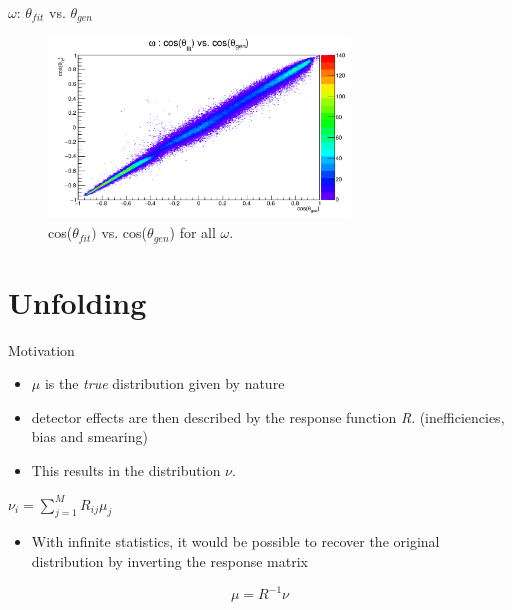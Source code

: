 \documentclass[
		10pt
		]{beamer}
\begin{document}
\begin{frame} {$\omega$: $\theta_{fit}$ vs. $\theta_{gen}$}

\begin{figure}
	
	\includegraphics[width=8cm]{Plots/MC/1/ThetaTheta1Omega.pdf}
	\captionsetup{labelformat=empty}
	\caption{cos($\theta_{fit})$ vs. cos($\theta_{gen}$) for all $\omega$.}
	
\end{figure}

\end{frame}

	



\section{Unfolding}

\begin{frame}{Motivation}
	\begin{itemize}
		\item $\mu$ is the \textit{true} distribution given by nature
		\item detector effects are then described by the response function \textit{R}. (inefficiencies, bias and smearing)
		\item This results in the distribution $\nu$. 
	\end{itemize}
		\begin{center}
$		\nu_i = \sum_{j=1}^{M} R_{ij} \mu_j$  
		\end{center}
	
	\begin{itemize}		
		\item With infinite statistics, it would be possible to recover the original distribution by inverting the response matrix
		
	\end{itemize}

\begin{equation*}
	\mu = R^{-1} \nu
\end{equation*}


\end{frame}
\end{document}
